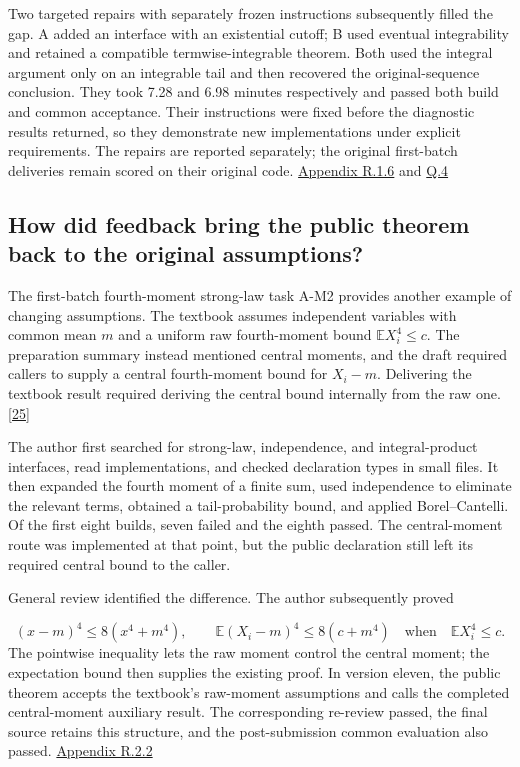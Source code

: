 Two targeted repairs with separately frozen instructions subsequently filled the gap. A added an interface with an existential cutoff; B used eventual integrability and retained a compatible termwise-integrable theorem. Both used the integral argument only on an integrable tail and then recovered the original-sequence conclusion. They took 7.28 and 6.98 minutes respectively and passed both build and common acceptance. Their instructions were fixed before the diagnostic results returned, so they demonstrate new implementations under explicit requirements. The repairs are reported separately; the original first-batch deliveries remain scored on their original code. \href{en-appendix.pdf\#r1-6}{Appendix R.1.6} and \href{en-appendix.pdf\#q4}{Q.4}

\subsection[How did feedback bring the public theorem back to the original assumptions?]{\texorpdfstring{\protect\hypertarget{section-4-2}{}How did feedback bring the public theorem back to the original assumptions?}{How did feedback bring the public theorem back to the original assumptions?}}
The first-batch fourth-moment strong-law task A-M2 provides another example of changing assumptions. The textbook assumes independent variables with common mean $m$ and a uniform raw fourth-moment bound $\mathbb E X_i^4\le c$. The preparation summary instead mentioned central moments, and the draft required callers to supply a central fourth-moment bound for $X_i-m$. Delivering the textbook result required deriving the central bound internally from the raw one. \hyperlink{ref-25}{\mbox{[25]}}

The author first searched for strong-law, independence, and integral-product interfaces, read implementations, and checked declaration types in small files. It then expanded the fourth moment of a finite sum, used independence to eliminate the relevant terms, obtained a tail-probability bound, and applied Borel–Cantelli. Of the first eight builds, seven failed and the eighth passed. The central-moment route was implemented at that point, but the public declaration still left its required central bound to the caller.

General review identified the difference. The author subsequently proved

\[
(x-m)^4\leq8(x^4+m^4),\qquad
\mathbb E(X_i-m)^4\leq8(c+m^4)
\quad\text{when}\quad\mathbb E X_i^4\leq c.
\]
The pointwise inequality lets the raw moment control the central moment; the expectation bound then supplies the existing proof. In version eleven, the public theorem accepts the textbook's raw-moment assumptions and calls the completed central-moment auxiliary result. The corresponding re-review passed, the final source retains this structure, and the post-submission common evaluation also passed. \href{en-appendix.pdf\#r2-2}{Appendix R.2.2}


